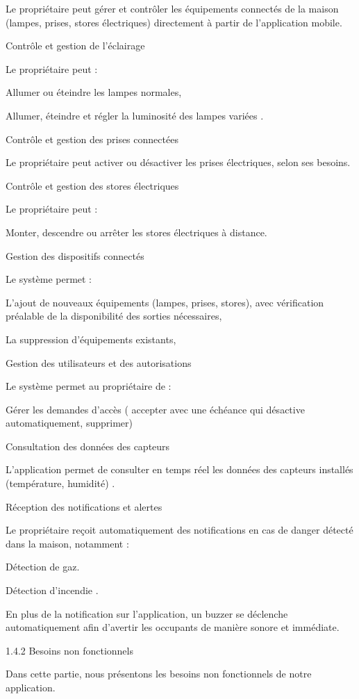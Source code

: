 \documentclass{article}
\begin{document}
Le propriétaire peut gérer et contrôler les équipements connectés de la maison (lampes, prises, stores électriques) directement à partir de l’application mobile.

Contrôle et gestion de l’éclairage

Le propriétaire peut :

Allumer ou éteindre les lampes normales,

Allumer, éteindre et régler la luminosité des lampes variées .

Contrôle et gestion des prises connectées

Le propriétaire peut activer ou désactiver les prises électriques, selon ses besoins.

Contrôle et gestion des stores électriques

Le propriétaire peut :

Monter, descendre ou arrêter les stores électriques à distance.

Gestion des dispositifs connectés

Le système permet :

L’ajout de nouveaux équipements (lampes, prises, stores), avec vérification préalable de la disponibilité des sorties nécessaires,

La suppression d’équipements existants,

Gestion des utilisateurs et des autorisations

Le système permet au propriétaire de :

Gérer les demandes d’accès ( accepter avec une échéance qui désactive automatiquement, supprimer)

Consultation des données des capteurs

L’application permet de consulter en temps réel les données des capteurs installés (température, humidité) .

Réception des notifications et alertes

Le propriétaire reçoit automatiquement des notifications en cas de danger détecté dans la maison, notamment :

Détection de gaz.

Détection d’incendie .

En plus de la notification sur l’application, un buzzer se déclenche automatiquement afin d’avertir les occupants de manière sonore et immédiate.

1.4.2 Besoins non fonctionnels

Dans cette partie, nous présentons les besoins non fonctionnels de notre application.
\end{document}
